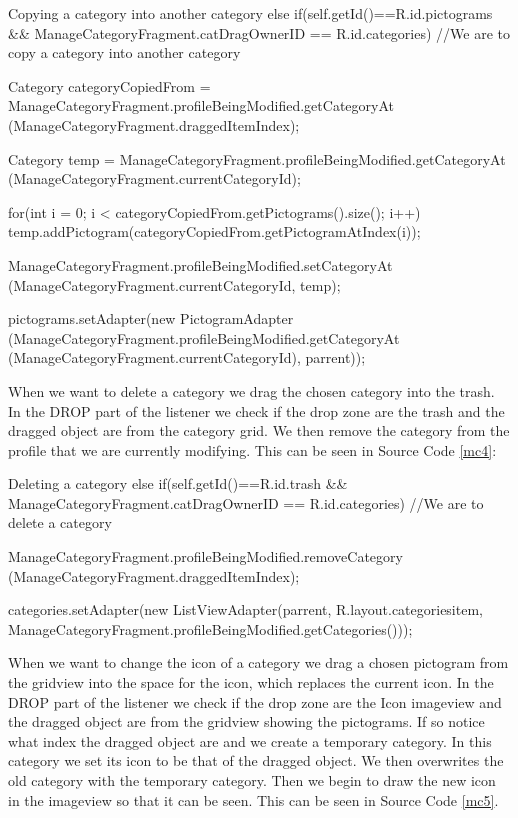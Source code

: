 \begin{source}[{mc3}]{Copying a category into another category}
else if(self.getId()==R.id.pictograms && ManageCategoryFragment.catDragOwnerID == R.id.categories) //We are to copy a category into another category
				{	
					
					Category categoryCopiedFrom = ManageCategoryFragment.profileBeingModified.getCategoryAt
						(ManageCategoryFragment.draggedItemIndex); 
					
					Category temp = ManageCategoryFragment.profileBeingModified.getCategoryAt
						(ManageCategoryFragment.currentCategoryId);
					
					for(int i = 0; i < categoryCopiedFrom.getPictograms().size(); i++)
					{
						temp.addPictogram(categoryCopiedFrom.getPictogramAtIndex(i)); 
					}
					
					ManageCategoryFragment.profileBeingModified.setCategoryAt
						(ManageCategoryFragment.currentCategoryId, temp);
					
					pictograms.setAdapter(new PictogramAdapter
						(ManageCategoryFragment.profileBeingModified.getCategoryAt
						(ManageCategoryFragment.currentCategoryId), parrent));
				}
\end{source}
When we want to delete a category we drag the chosen category into the trash. 
In the DROP part of the listener we check if the drop zone are the trash and the dragged object are from the category grid. 
We then remove the category from the profile that we are currently modifying. 
This can be seen in Source Code \ref{mc4}:

\begin{source}[{mc4}]{Deleting a category}
else if(self.getId()==R.id.trash && ManageCategoryFragment.catDragOwnerID == R.id.categories) //We are to delete a category
				{	
					ManageCategoryFragment.profileBeingModified.removeCategory
						(ManageCategoryFragment.draggedItemIndex);
					
					categories.setAdapter(new ListViewAdapter(parrent, R.layout.categoriesitem,
						ManageCategoryFragment.profileBeingModified.getCategories()));
				}
\end{source}
When we want to change the icon of a category we drag a chosen pictogram from the gridview into the space for the icon, which replaces the current icon. 
In the DROP part of the listener we check if the drop zone are the Icon imageview and the dragged object are from the gridview showing the pictograms. 
If so notice what index the dragged object are and we create a temporary category. 
In this category we set its icon to be that of the dragged object.  
We then overwrites the old category with the temporary category.
Then we begin to draw the new icon in the imageview so that it can be seen. 
This can be seen in Source Code \ref{mc5}.

